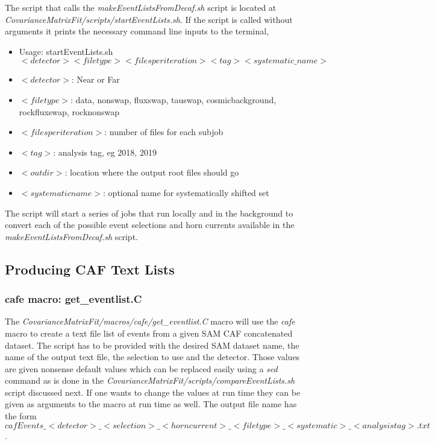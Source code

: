 The script that calls the {\it makeEventListsFromDecaf.sh} script is located at {\it CovarianceMatrixFit/scripts/startEventLists.sh}.  If the script is called without arguments it prints the necessary command line inputs to the terminal,
\begin{itemize}
  \item Usage: startEventLists.sh $<detector> <file type> <files per iteration> <tag> <systematic\_name>$
  \item $<detector>$: Near or Far
  \item $<file type>$: data, nonswap, fluxswap, tauswap, cosmicbackground, rockfluxswap, rocknonswap
  \item $<files per iteration>$: number of files for each subjob
  \item $<tag>$: analysis tag, eg 2018, 2019
  \item $<outdir>$: location where the output root files should go
  \item $<systematic name>$: optional name for systematically shifted set
\end{itemize}
The script will start a series of jobs that run locally and in the background to convert each of the possible event selections and horn currents available in the {\it makeEventListsFromDecaf.sh} script.

\subsection{Producing CAF Text Lists}

\subsubsection{cafe macro: get\_eventlist.C}

The {\it CovarianceMatrixFit/macros/cafe/get\_eventlist.C} macro will use the {\it cafe} macro to create a text file list of events from a given SAM CAF concatenated dataset.  The script has to be provided with the desired SAM dataset name, the name of the output text file, the selection to use and the detector. Those values are given nonsense default values which can be replaced easily using a {\it sed} command as is done in the {\it CovarianceMatrixFit/scripts/compareEventLists.sh} script discussed next.  If one wants to change the values at run time they can be given as arguments to the macro at run time as well. The output file name has the form $cafEvents\_<detector>\_<selection>\_<horn current>\_<file type>\_<systematic>\_<analysis tag>.txt$.

